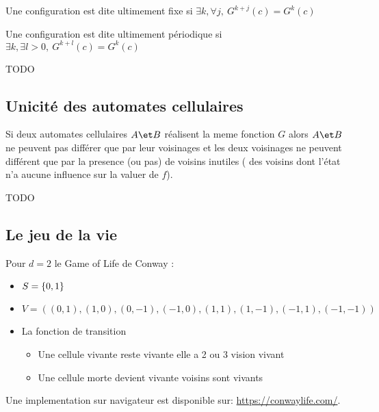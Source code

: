 \begin{definition}
	Une configuration est dite ultimement fixe si $\exists k, \forall j, \ G^{k+j}(c) =  G^{k}(c)$
\end{definition}


\begin{definition}
	Une configuration est dite ultimement périodique si $\exists k, \exists l>0, \ G^{k+l}(c) =  G^{k}(c)$
\end{definition}


\begin{exemple}
	TODO
\end{exemple}


\subsection{Unicité des automates cellulaires}


\begin{theorem}
	Si deux automates cellulaires $A \et B$ réalisent la meme fonction $G$ alors $A \et B$ ne peuvent pas différer que par
	leur voisinages et les deux voisinages ne peuvent différent que par la presence (ou pas) de voisins inutiles (\cad
	des voisins dont l'état n'a aucune influence sur la valuer de $f$).
\end{theorem}


\begin{exemple}
	TODO
\end{exemple}

\subsection{Le jeu de la vie}

\begin{exemple}
	Pour $d = 2$ le Game of Life de Conway \cite{conwayGOL}:
	\begin{itemize}
		\item $S = \left\{0,1\right\}$
		\item $V = ((0,1), (1,0), (0,-1), (-1,0), (1,1), (1,-1), (-1,1), (-1,-1))$
		\item La fonction de transition
		      \begin{itemize}
			      \item Une cellule vivante reste vivante \ssi elle a 2 ou 3 vision vivant
			      \item Une cellule morte devient vivante  voisins sont vivants
		      \end{itemize}
	\end{itemize}


	Une implementation sur navigateur est disponible sur: \url{https://conwaylife.com/}.
\end{exemple}

